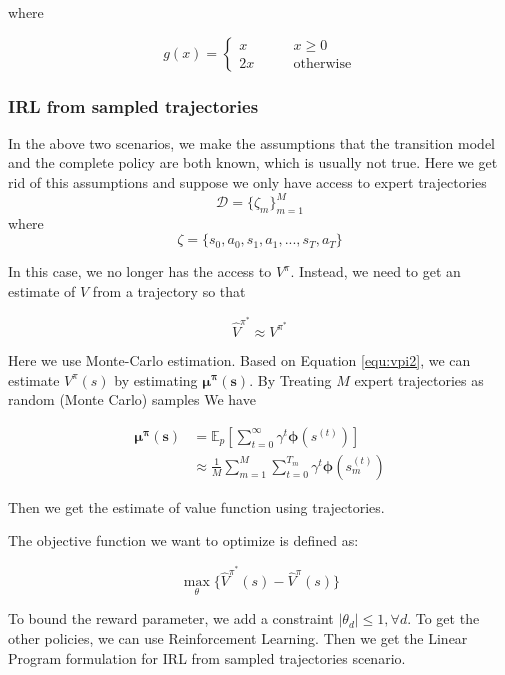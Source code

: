 \documentclass[11pt]{article}
\begin{document}
where

\begin{equation*}
g(x) =\left\{
\begin{aligned}
x \quad \quad & x\geq 0\\
2x \quad \quad & \text{otherwise}
\end{aligned}
\right.
\end{equation*}



\subsubsection{IRL from sampled trajectories}
In the above two scenarios, we make the assumptions that the transition model and the complete policy are both known, which is usually not true. Here we get rid of this assumptions and suppose we only have access to expert trajectories 
$$\mathcal{D} = \{ \zeta_m \}_{m=1}^M$$
where
$$\zeta = \{ s_0,a_0,s_1,a_1,...,s_T,a_T\}$$

In this case, we no longer has the access to $V^\pi$. Instead, we need to get an estimate of $V$ from a trajectory so that

$$\hat{V}^{\pi^*} \approx V^{\pi^*}$$

Here we use Monte-Carlo estimation. Based on Equation \ref{equ:vpi2}, we can estimate $V^\pi(s)$ by estimating $\boldsymbol{\mu^\pi(s)}$. By Treating $M$ expert trajectories as random (Monte Carlo) samples We have

\begin{equation*}
\begin{split}
\boldsymbol{\mu^\pi(s)} & = \mathbb{E}_p[\sum_{t=0}^\infty \gamma^t\boldsymbol{\phi}(s^{(t)})] \\
& \approx \frac{1}{M} \sum_{m=1}^M \sum_{t=0}^{T_m} \gamma^t\boldsymbol{\phi}(s_m^{(t)})
\end{split}
\end{equation*}

Then we get the estimate of value function using trajectories.

The objective function we want to optimize is defined as:

$$\max_\theta \{\hat{V}^{\pi^*}(s) - \hat{V}^{\pi}(s) \}$$

To bound the reward parameter, we add a constraint $|\theta_d| \leq 1, \forall{d}$. To get the other policies, we can use Reinforcement Learning. Then we get the Linear Program formulation for IRL from sampled trajectories scenario.
\end{document}

